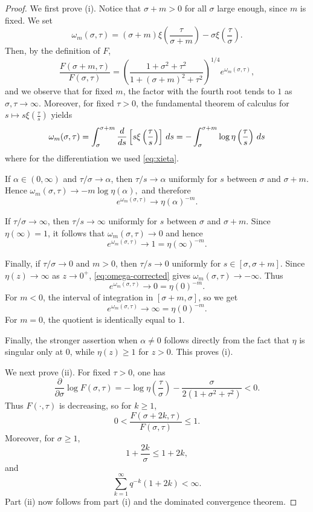 \documentclass[11pt,a4paper,reqno]{amsart}
\theoremstyle{plain}
\theoremstyle{remark}
\theoremstyle{definition}
\theoremstyle{remark}
\numberwithin{equation}{section}
\def\int{\intop\nolimits}
\begin{document}
\begin{proof}
We first prove \rm(i). Notice that $\sigma +m>0$ for all $\sigma$ large enough, since $m$ is fixed. We set
\[
\omega_m(\sigma,\tau)
=
(\sigma+m)\xi\left(\frac{\tau}{\sigma+m}\right)
-
\sigma\xi\left(\frac{\tau}{\sigma}\right).
\] 
Then, by the definition of $F$,
\[
\frac{F(\sigma+m,\tau)}{F(\sigma,\tau)}
=
\left(
\frac{1+\sigma^2+\tau^2}
     {1+(\sigma+m)^2+\tau^2}
\right)^{1/4}
e^{\omega_m(\sigma,\tau)},
\]
and we observe that for fixed $m$, the factor with the fourth root tends to $1$ as
$\sigma,\tau\to\infty$. Moreover, for fixed $\tau>0$, the fundamental theorem of calculus for $s\mapsto s\xi\left(\frac{\tau}{s}\right)$ yields
\begin{equation}\label{eq:omega-corrected}
\omega_m(\sigma,\tau)
=\int_\sigma^{\sigma+m}
\frac{d}{ds}\left[ s\xi\left(\frac{\tau}{s}\right)\right]\,ds=
-\int_\sigma^{\sigma+m}
\log\eta\left(\frac{\tau}{s}\right)\,ds
\end{equation}
where for the differentiation we used \eqref{eq:xieta}.

If $\alpha\in(0,\infty)$ and $\tau/\sigma\to\alpha$, then
$\tau/s\to\alpha$ uniformly for
$s$ between $\sigma$ and $\sigma+m$. Hence $\omega_m(\sigma,\tau)
\to 
-m\log\eta(\alpha),$
and therefore
\[
e^{\omega_m(\sigma,\tau)}
\to 
\eta(\alpha)^{-m}.
\]

If $\tau/\sigma\to\infty$, then $\tau/s\to\infty$ uniformly for
$s$ between $\sigma$ and $\sigma+m$. Since $\eta(\infty)=1$, it follows that $
\omega_m(\sigma,\tau)\to 0$ 
and hence
\[
e^{\omega_m(\sigma,\tau)}
\to 1=\eta(\infty)^{-m}.
\]

Finally, if $\tau/\sigma\to0$ and $m> 0$, then $\tau/s\to0$ uniformly for
$s\in[\sigma, \sigma+m]$. Since $\eta(z)\to\infty$ as $z\to0^+$,
\eqref{eq:omega-corrected} gives
$\omega_m(\sigma,\tau)\to -\infty.$
Thus
\[
e^{\omega_m(\sigma,\tau)}
\to 0=\eta(0)^{-m}.
\]
For $m<0$, the interval of integration in $[\sigma+m, \sigma]$, so we get 
\[
e^{\omega_m(\sigma,\tau)}
\to \infty=\eta(0)^{-m}.
\]
For $m=0$, the quotient is identically equal to $1$.

Finally, the stronger assertion when $\alpha\neq 0$ follows directly from the fact that $\eta$ is singular only at $0$, while $\eta(z)\geq 1$ for $z>0$. This proves \rm(i).

We next prove \rm(ii). For fixed $\tau>0$, one has
\[
\frac{\partial}{\partial\sigma}\log F(\sigma,\tau)
=
-\log\eta\left(\frac{\tau}{\sigma}\right)
-\frac{\sigma}{2(1+\sigma^2+\tau^2)}
<0.
\]
Thus $F(\cdot,\tau)$ is decreasing, so for $k\geq 1$, 
\[
0<
\frac{F(\sigma+2k,\tau)}{F(\sigma,\tau)}
\leq1.
\]
Moreover, for $\sigma\geq1$,
\[
1+\frac{2k}{\sigma}\leq1+2k,
\]
and
\[
\sum_{k=1}^{\infty}q^{-k}(1+2k)<\infty.
\]
Part \rm(ii) now follows from part \rm(i) and the dominated convergence
theorem.


\end{proof}
\end{document}
